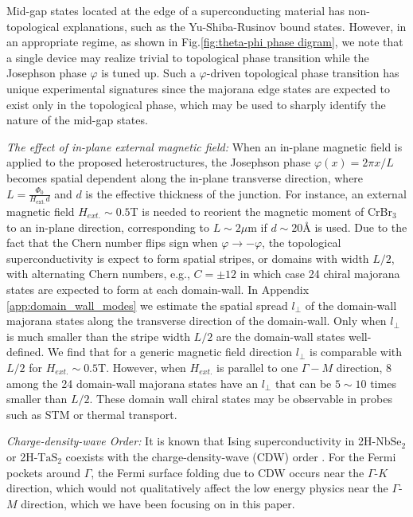 Mid-gap states located at the edge of a superconducting material has non-topological explanations, such as the Yu-Shiba-Rusinov bound states. However, in an appropriate regime, as shown in Fig.\ref{fig:theta-phi phase digram}, we note that a single device may realize trivial to topological phase transition while the Josephson phase $\varphi$ is tuned up. Such a $\varphi$-driven topological phase transition has unique experimental signatures since the majorana edge states are expected to exist only in the topological phase, which may be used to sharply identify the nature of the mid-gap states. 

\vspace{1em}

\emph{The effect of in-plane external magnetic field:} When an in-plane magnetic field is applied to the proposed heterostructures, the Josephson phase $\varphi(x)=2\pi x/L$ becomes spatial dependent along the in-plane transverse direction, where $L=\frac{\Phi_0}{H_{\text{ext.}}d}$ and $d$ is the effective thickness of the junction. For instance, an external magnetic field $H_{ext.}\sim 0.5$T is needed to reorient the magnetic moment of CrBr$_3$ to an in-plane direction, corresponding to $L\sim 2\mu$m if $d\sim 20\text{\AA}$ is used. Due to the fact that the Chern number flips sign when $\varphi\rightarrow -\varphi$, the topological superconductivity is expect to form spatial stripes, or domains with width $L/2$, with alternating Chern numbers, e.g., $C=\pm12$ in which case 24 chiral majorana states are expected to form at each domain-wall. In Appendix \ref{app:domain_wall_modes} we estimate the spatial spread $l_\perp$  of the domain-wall majorana states along the transverse direction of the domain-wall. Only when $l_\perp$ is much smaller than the stripe width $L/2$ are the domain-wall states well-defined. We find that for a generic magnetic field direction $l_\perp$ is comparable with $L/2$ for $H_{ext.}\sim 0.5$T. However, when $H_{ext.}$ is parallel to one $\Gamma-M$ direction, 8 among the 24 domain-wall majorana states have an $l_\perp$ that can be $5\sim 10$ times smaller than $L/2$. These domain wall chiral states may be observable in probes such as STM or thermal transport.

	

\vspace{1em}
\emph{Charge-density-wave Order:} It is known that Ising superconductivity in 2H-$\mathrm{NbSe_2}$ or 2H-$\mathrm{TaS_2}$ coexists with the charge-density-wave (CDW) order \cite{ugeda2016characterization,xi2015strongly,nakata2018anisotropic}. For the Fermi pockets around $\Gamma$, the Fermi surface folding due to CDW occurs near the $\Gamma$-$K$ direction, which would not qualitatively affect the low energy physics near the $\Gamma$-$M$ direction, which we have been focusing on in this paper. 

